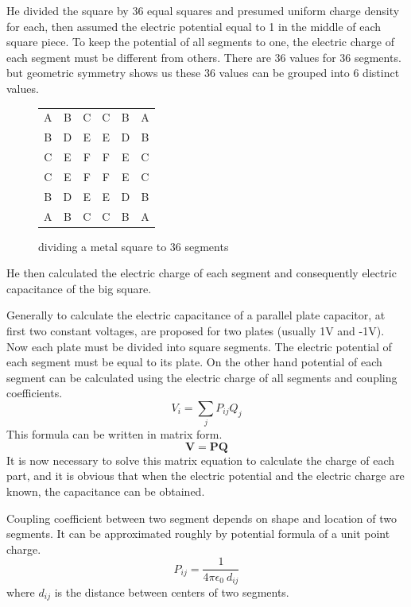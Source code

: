 \documentclass[final,5p,times,twocolumn]{elsarticle}
\begin{document}
He divided the square by 36 equal squares and presumed uniform charge density for each, then assumed the electric potential equal to 1 in the middle of each square piece. To keep the potential of all segments to one, the electric charge of each segment must be different from others. There are 36 values for 36 segments. but geometric symmetry shows us these 36 values can be grouped into 6 distinct values.
\begin {figure}
\center
\begin{tabular}{ c c c c c c }
  A & B & C & C & B & A \\
  B & D & E & E & D & B \\
  C & E & F & F & E & C \\
  C & E & F & F & E & C \\
  B & D & E & E & D & B \\
  A & B & C & C & B & A \\
\end{tabular}
\caption{dividing a metal square to 36 segments}
\end{figure}
He then calculated the electric charge of each segment and consequently electric capacitance of the big square.

Generally to calculate the electric capacitance of a parallel plate capacitor, at first two constant voltages, are proposed for two plates (usually 1V and -1V). Now each plate must be divided into square segments. The electric potential of each segment must be equal to its plate. On the other hand potential of each segment can be calculated using the electric charge of all segments and coupling coefficients.
\begin{equation}
\label{eq1}
V_i = \sum_j P_{ij} Q_j
\end{equation}
This formula can be written in matrix form.
\begin{equation}
\label{eq2}
\mathbf V = \mathbf P \mathbf Q
\end{equation}
It is now necessary to solve this matrix equation to calculate the charge of each part, and it is obvious that when the electric potential and the electric charge are known, the capacitance can be obtained.
 
Coupling coefficient between two segment depends on shape and location of two segments. It can be approximated roughly by potential formula of a unit point charge. 
\begin{equation}
\label{eq3}
P_{ij} = \frac{1}{4 \pi \epsilon_0\  d_{ij}}
\end{equation}
where $d_{ij}$ is the distance between centers of two segments.
\end{document}
